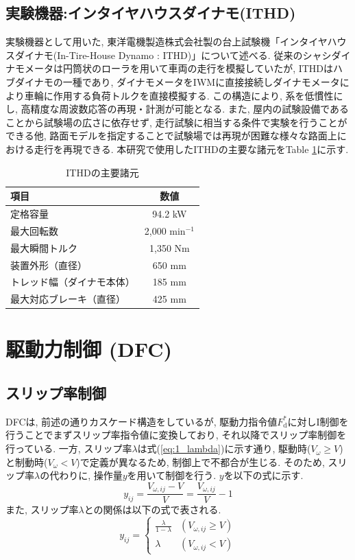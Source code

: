 \documentclass[11pt,a4paper,oneside,onecolumn,fleqn,dvipdfmx]{jsarticle}
\begin{document}
\subsection{実験機器:インタイヤハウスダイナモ(ITHD)}
実験機器として用いた, 東洋電機製造株式会社製の台上試験機「インタイヤハウスダイナモ(In-Tire-House Dynamo : ITHD)」\cite{ithd}について述べる. 
従来のシャシダイナモメータは円筒状のローラを用いて車両の走行を模擬していたが, ITHDはハブダイナモの一種であり, ダイナモメータをIWMに直接接続しダイナモメータにより車輪に作用する負荷トルクを直接模擬する.
この構造により, 系を低慣性にし, 高精度な周波数応答の再現・計測が可能となる.
また, 屋内の試験設備であることから試験場の広さに依存せず, 走行試験に相当する条件で実験を行うことができる他, 路面モデルを指定することで試験場では再現が困難な様々な路面上における走行を再現できる.
本研究で使用したITHDの主要な諸元をTable \ref{table:2_ITHD}に示す. 

\begin{table}[tb]
    \centering
    \caption{ITHDの主要諸元}
    \label{table:2_ITHD}
    \begin{tabular}{lc}
        \hline
        項目 & 数値 \\
        \hline
        定格容量 & 94.2 kW \\
        最大回転数 & 2,000 min$^{-1}$ \\
        最大瞬間トルク & 1,350 Nm \\
        装置外形（直径） & 650 mm \\
        トレッド幅（ダイナモ本体） & 185 mm \\
        最大対応ブレーキ（直径） & 425 mm \\
        \hline
    \end{tabular}
\end{table}

\clearpage
\section{駆動力制御 (DFC)}
\subsection{スリップ率制御}
DFCは, 前述の通りカスケード構造をしているが, 駆動力指令値$F^*_\mathrm{d}$に対しI制御を行うことでまずスリップ率指令値に変換しており, それ以降でスリップ率制御を行っている.
一方, スリップ率$\lambda$は式(\ref{eq:1_lambda})に示す通り, 駆動時($V_\omega \ge V$)と制動時($V_\omega < V$)で定義が異なるため, 制御上で不都合が生じる. 
そのため, スリップ率$\lambda$の代わりに, 操作量$y$を用いて制御を行う. $y$を以下の式に示す. 
\begin{equation}
\label{eq:3_y}
y_{ij} = \frac{V_{\omega,ij} - V}{V} = \frac{V_{\omega,ij}}{V} - 1
\end{equation}
また, スリップ率$\lambda$との関係は以下の式で表される. 
\begin{equation}
    \label{eq:3_y_lambda}
    y_{ij}
    =
    \begin{cases}
    \frac{\lambda}{1 - \lambda} & (V_{\omega,ij} \ge V) \\
    \lambda & (V_{\omega,ij} < V)
    \end{cases}
\end{equation}
\end{document}
